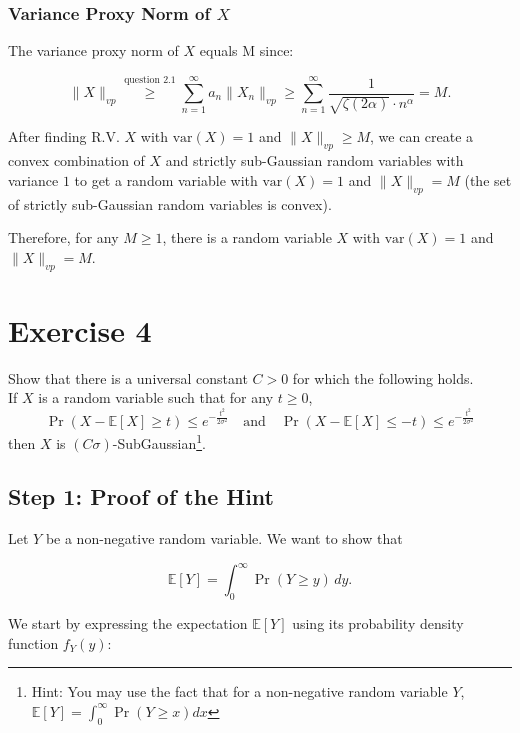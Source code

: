 \documentclass[a4 paper]{article}
\theoremstyle{boldStyle}
\theoremstyle{boldBlueStyle}
\theoremstyle{boldPurpleStyle}
\theoremstyle{boldRedStyle}
\begin{document}
\begin{enumerate}
\subsubsection*{Variance Proxy Norm of \(X\)}

The variance proxy norm of \(X\) equals M since:

\[
\|X\|_{vp} \stackrel{\text{question 2.1}}{\geq} \sum_{n=1}^{\infty} a_n \|X_n\|_{vp} \geq \sum_{n=1}^{\infty} \frac{1}{\sqrt{\zeta(2\alpha)} \cdot n^\alpha} = M.
\]

After finding R.V. $X$ with $\mathrm{var}(X) = 1$ and $\|X\|_{vp} \geq M$, 
we can create a convex combination of $X$ and strictly sub-Gaussian random variables with variance $1$ 
to get a random variable with $\mathrm{var}(X) = 1$ and $\|X\|_{vp} = M$ (the set of strictly sub-Gaussian random variables is convex).

Therefore, for any \(M \geq 1\), there is a random variable \(X\) with \(\mathrm{var}(X) = 1\) and \(\|X\|_{vp} = M\).


\end{enumerate}








\newpage
\section*{Exercise 4}
\textcolor{blueColor}{
Show that there is a universal constant \(C > 0\) for which the following holds. \\
If \(X\) is a random variable such that for any \(t \geq 0\),
\[
\Pr(X - \mathbb{E}[X] \geq t) \leq e^{-\frac{t^2}{2\sigma^2}} \quad \text{and} \quad \Pr(X - \mathbb{E}[X] \leq -t) \leq e^{-\frac{t^2}{2\sigma^2}}
\]
then \(X\) is \((C\sigma)\)-SubGaussian\footnote{Hint: You may use the fact that for a non-negative random variable \(Y\), \(\mathbb{E}[Y] = \int_0^\infty \Pr(Y \geq x)dx\)}.
}

\bigbreak

\subsection*{Step 1: Proof of the Hint}


Let \(Y\) be a non-negative random variable. We want to show that

\[
\mathbb{E}[Y] = \int_0^\infty \Pr(Y \geq y) \, dy.
\]

We start by expressing the expectation \(\mathbb{E}[Y]\) using its probability density function \(f_Y(y)\):
\end{document}
